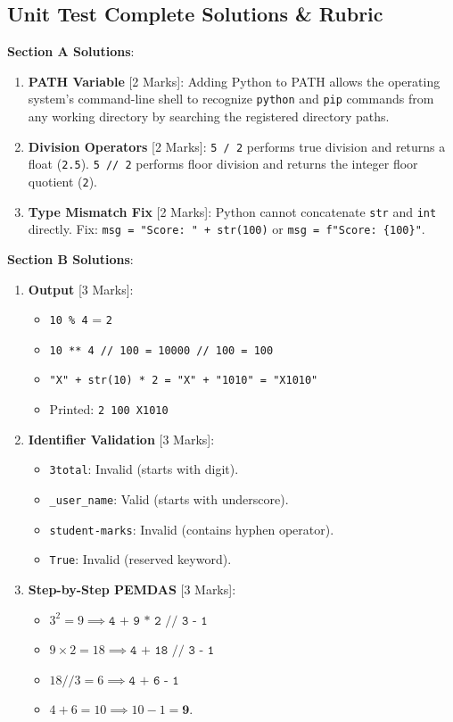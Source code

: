 \subsection{Unit Test Complete Solutions \& Rubric}

\begin{solutionbox}
\noindent\textbf{Section A Solutions}:
\begin{enumerate}
    \item \textbf{PATH Variable} [2 Marks]: Adding Python to PATH allows the operating system's command-line shell to recognize \texttt{python} and \texttt{pip} commands from any working directory by searching the registered directory paths.
    \item \textbf{Division Operators} [2 Marks]: \texttt{5 / 2} performs true division and returns a float (\texttt{2.5}). \texttt{5 // 2} performs floor division and returns the integer floor quotient (\texttt{2}).
    \item \textbf{Type Mismatch Fix} [2 Marks]: Python cannot concatenate \texttt{str} and \texttt{int} directly. Fix: \texttt{msg = "Score: " + str(100)} or \texttt{msg = f"Score: \{100\}"}.
\end{enumerate}

\noindent\textbf{Section B Solutions}:
\begin{enumerate}[start=4]
    \item \textbf{Output} [3 Marks]:
    \begin{itemize}
        \item \texttt{10 \% 4} = \texttt{2}
        \item \texttt{10 ** 4 // 100 = 10000 // 100 = 100}
        \item \texttt{"X" + str(10) * 2 = "X" + "1010" = "X1010"}
        \item Printed: \texttt{2 100 X1010}
    \end{itemize}
    \item \textbf{Identifier Validation} [3 Marks]:
    \begin{itemize}
        \item \texttt{3total}: Invalid (starts with digit).
        \item \texttt{\_user\_name}: Valid (starts with underscore).
        \item \texttt{student-marks}: Invalid (contains hyphen operator).
        \item \texttt{True}: Invalid (reserved keyword).
    \end{itemize}
    \item \textbf{Step-by-Step PEMDAS} [3 Marks]:
    \begin{itemize}
        \item $3^2 = 9 \implies \texttt{4 + 9 * 2 // 3 - 1}$
        \item $9 \times 2 = 18 \implies \texttt{4 + 18 // 3 - 1}$
        \item $18 // 3 = 6 \implies \texttt{4 + 6 - 1}$
        \item $4 + 6 = 10 \implies 10 - 1 = \mathbf{9}$.
    \end{itemize}
\end{enumerate}


\end{solutionbox}
